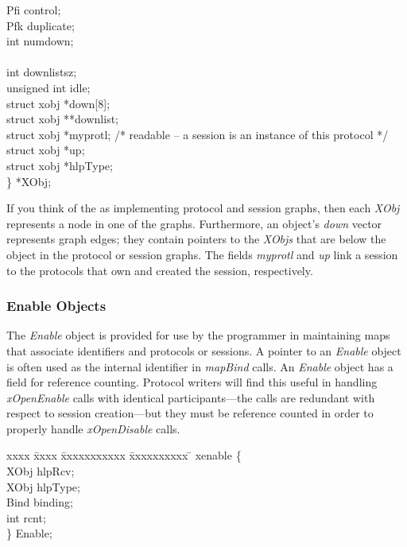 \begin{tabbing}
\>\>  {\sem Pfi}  	\>control;\\
\>\>  {\sem Pfk}  	\>duplicate;\\
\>\>  {\sem int}  	\>numdown; \\
\>\>\\
\>\>  {\sem int} 	\>downlistsz;\\
\>\>  {\sem unsigned int} \>idle;\\
\>\>  {\sem struct xobj} \>*down[8];\\
\>\>  {\sem struct xobj} \>**downlist;\\
\>\>  {\sem struct xobj} \>*myprotl;\> {\smallfont /* readable -- a session is an instance of this protocol */}\\
\>\>  {\sem struct xobj} \>*up; \\
\>\>  {\sem struct xobj} \>*hlpType;\\
\>\} *{\bold XObj};
\end{tabbing}

If you think of the \xk{} as implementing protocol and session graphs,
then each {\em XObj} represents a node in one of the graphs.
Furthermore, an object's {\em down} vector represents graph edges;
they contain pointers to the {\em XObjs} that are below the object in
the protocol or session graphs. The fields {\em myprotl} and {\em up}
link a session to the protocols that own and created the session,
respectively.


\subsubsection{Enable Objects}
\label{enable_objects}

The {\em Enable} object is provided for use by the programmer in
maintaining maps that associate identifiers and protocols or sessions.
A pointer to an {\em Enable} object is often used as the internal
identifier in {\em mapBind} calls.  An {\em Enable} object has a field
for reference counting. Protocol writers will find this useful in
handling {\em xOpenEnable} calls with identical participants---the
calls are redundant with respect to session creation---but they must
be reference counted in order to properly handle {\em xOpenDisable}
calls.

\begin{tabbing}
xxxx \= xxxx \= xxxxxxxxxxx \= xxxxxxxxxx \=\kill
{} {\bold xenable}  \{\\
\>\>  {\sem XObj}         \>hlpRcv;\>\\
\>\>  {\sem XObj}         \>hlpType;\>\\
\>\>  {\sem Bind} 	\>binding;\>\\
\>\>  {\sem int} 	\>rcnt;\>\\
\>\} {\bold Enable};
\end{tabbing}

